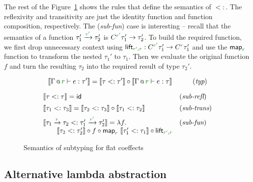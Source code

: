 The rest of the Figure~\ref{fig:flat-semantics-sub} shows the rules that define the semantics
of $<:$. The reflexivity and transitivity are just the identity function and function composition,
respectively. The (\emph{sub-fun}) case is interesting -- recall that the semantics of a function
$\tau_1' \xrightarrow{\cclrd{r'}} \tau_2'$ is $C^{\cclrd{r'}} \tau_1' \rightarrow \tau_2'$. To 
build the required function, we first drop unnecessary context using $\ident{lift}_{\cclrd{r'}, \cclrd{r}}
 : C^{\cclrd{r'}} \tau_1' \rightarrow C^{\cclrd{r}} \tau_1'$ and use the $\ident{map}_{\cclrd{r}}$
function to transform the nested $\tau_1'$ to $\tau_1$. Then we evaluate the original function $f$
and turn the resulting $\tau_2$ into the required result of type $\tau_2'$.


\begin{figure}[t]

\begin{equation*}
\sem{\coctx{\Gamma}{\cclrd{r}} \vdash e : \tau' } = 
  \sem{\tau <: \tau'} \circ \sem{\coctx{\Gamma}{\cclrd{r}} \vdash e : \tau } \qquad\quad (\emph{typ})
\end{equation*}

\begin{equation*}
\begin{array}{ll}
\sem{\tau <: \tau} = \ident{id} & (\emph{sub-refl})
\\[0.5em]
\sem{\tau_1 <: \tau_3} = \sem{\tau_2 <: \tau_3} \circ \sem{\tau_1 <: \tau_2} & (\emph{sub-trans})
\\[0.5em]
\sem{\tau_1 \xrightarrow{\cclrd{r}} \tau_2 <: \tau_1' \xrightarrow{\cclrd{r'}} \tau_2'} = \lambda f. & (\emph{sub-fun}) \\
\qquad\sem{\tau_2 <: \tau_2'} \circ f \circ \ident{map}_{\cclrd{r}}~\sem{\tau_1' <: \tau_1} 
  \circ \ident{lift}_{\cclrd{r'}, \cclrd{r}}
\end{array}
\end{equation*}

\caption{Semantics of subtyping for flat coeffects}
\label{fig:flat-semantics-sub}
\end{figure}


\subsection{Alternative lambda abstraction}

